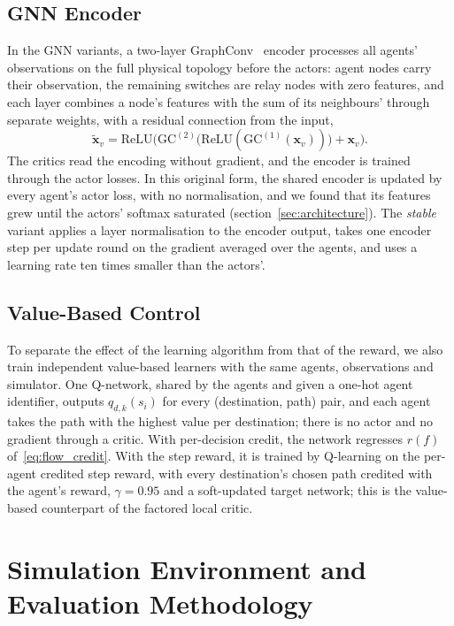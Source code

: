 \documentclass[10pt,journal,comsoc]{IEEEtran}
\begin{document}
\subsection{GNN Encoder}
In the GNN variants, a two-layer GraphConv~\cite{morris2019weisfeiler} encoder processes all agents' observations on the full physical topology before the actors: agent nodes carry their observation, the remaining switches are relay nodes with zero features, and each layer combines a node's features with the sum of its neighbours' through separate weights, with a residual connection from the input,
\begin{equation}
  \tilde{\mathbf{x}}_v = \mathrm{ReLU}\Big(\mathrm{GC}^{(2)}\big(\mathrm{ReLU}(\mathrm{GC}^{(1)}(\mathbf{x}_v))\big) + \mathbf{x}_v\Big).
  \label{eq:gnn_layer}
\end{equation}
The critics read the encoding without gradient, and the encoder is trained through the actor losses. In this original form, the shared encoder is updated by every agent's actor loss, with no normalisation, and we found that its features grew until the actors' softmax saturated (section~\ref{sec:architecture}). The \emph{stable} variant applies a layer normalisation to the encoder output, takes one encoder step per update round on the gradient averaged over the agents, and uses a learning rate ten times smaller than the actors'.

\subsection{Value-Based Control}
To separate the effect of the learning algorithm from that of the reward, we also train independent value-based learners with the same agents, observations and simulator. One Q-network, shared by the agents and given a one-hot agent identifier, outputs $q_{d,k}(s_i)$ for every (destination, path) pair, and each agent takes the path with the highest value per destination; there is no actor and no gradient through a critic. With per-decision credit, the network regresses $r(f)$ of~\eqref{eq:flow_credit}. With the step reward, it is trained by Q-learning on the per-agent credited step reward, with every destination's chosen path credited with the agent's reward, $\gamma = 0.95$ and a soft-updated target network; this is the value-based counterpart of the factored local critic.

\section{Simulation Environment and Evaluation Methodology} \label{expSetup}
\end{document}
